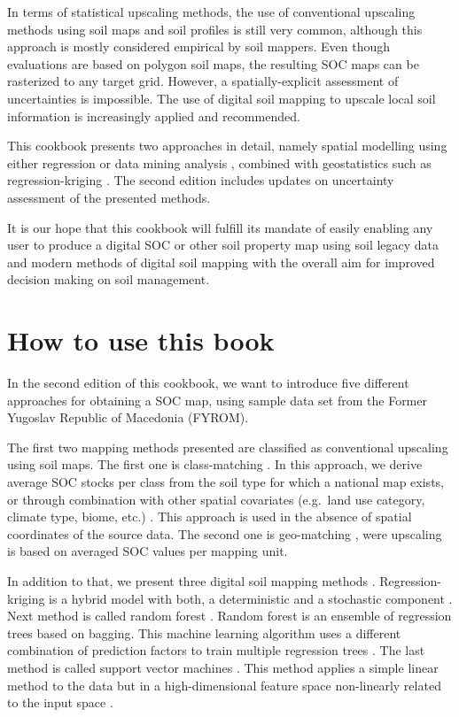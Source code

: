 \documentclass[10pt,b5paper,]{book}
\theoremstyle{definition}
\theoremstyle{definition}
\theoremstyle{definition}
\theoremstyle{remark}
\begin{document}
In terms of statistical upscaling methods, the use of conventional
upscaling methods using soil maps and soil profiles is still very
common, although this approach is mostly considered empirical by soil
mappers. Even though evaluations are based on polygon soil maps, the
resulting SOC maps can be rasterized to any target grid. However, a
spatially-explicit assessment of uncertainties is impossible. The use of
digital soil mapping to upscale local soil information is increasingly
applied and recommended.

This cookbook presents two approaches in detail, namely spatial
modelling using either regression or data mining analysis
, combined with geostatistics such as
regression-kriging . The second edition
includes updates on uncertainty assessment of the presented methods.

It is our hope that this cookbook will fulfill its mandate of easily
enabling any user to produce a digital SOC or other soil property map
using soil legacy data and modern methods of digital soil mapping
 with the overall aim for improved
decision making on soil management.

\hypertarget{how-to-use-this-book}{%
\section{How to use this book}\label{how-to-use-this-book}}

In the second edition of this cookbook, we want to introduce five
different approaches for obtaining a SOC map, using sample data set from
the Former Yugoslav Republic of Macedonia (FYROM).

The first two mapping methods presented are classified as conventional
upscaling using soil maps. The first one is class-matching
. In this approach, we derive average SOC stocks
per class from the soil type for which a national map exists, or through
combination with other spatial covariates (e.g.~land use category,
climate type, biome, etc.) . This
approach is used in the absence of spatial coordinates of the source
data. The second one is geo-matching , were
upscaling is based on averaged SOC values per mapping unit.

In addition to that, we present three digital soil mapping methods
. Regression-kriging
 is a hybrid model with both, a
deterministic and a stochastic component \citep{hengl2007regression}.
Next method is called random forest . Random
forest is an ensemble of regression trees based on bagging. This machine
learning algorithm uses a different combination of prediction factors to
train multiple regression trees \citep{Breiman1996}. The last method is
called support vector machines .
This method applies a simple linear method to the data but in a
high-dimensional feature space non-linearly related to the input space
\citep{Karatzoglou2006}.
\end{document}
